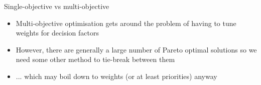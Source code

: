 \begin{frame}{Single-objective vs multi-objective}
    \begin{itemize}
        \pause\item Multi-objective optimisation gets around the problem of having to tune weights for
            decision factors
        \pause\item However, there are generally a large number of Pareto optimal solutions so we need some
            other method to tie-break between them
        \pause\item ... which may boil down to weights (or at least priorities) anyway
    \end{itemize}
\end{frame}
